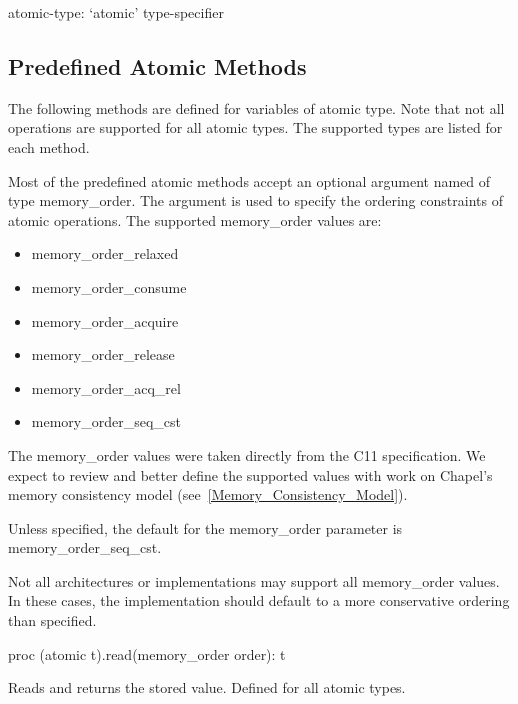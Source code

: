 \begin{syntax}
atomic-type:
  `atomic' type-specifier
\end{syntax}

\subsection{Predefined Atomic Methods}
\label{Functions_on_Atomic_Variables}

The following methods are defined for variables of atomic type. Note
that not all operations are supported for all atomic types. The
supported types are listed for each method.  

Most of the predefined atomic methods accept an optional argument
named  of type memory\_order. The  argument is
used to specify the ordering constraints of atomic operations. The
supported memory\_order values are:
\begin{itemize}
\item{memory\_order\_relaxed}
\item{memory\_order\_consume}
\item{memory\_order\_acquire}
\item{memory\_order\_release}
\item{memory\_order\_acq\_rel}
\item{memory\_order\_seq\_cst}
\end{itemize}

\begin{openissue}
  The memory\_order values were taken directly from the C11
  specification.  We expect to review and better define the supported
  values with work on Chapel's memory consistency model
  (see~\ref{Memory_Consistency_Model}).
\end{openissue}

Unless specified, the default for the memory\_order parameter is
memory\_order\_seq\_cst.

\begin{note}
Not all architectures or implementations may support all memory\_order
values.  In these cases, the implementation should default to a more
conservative ordering than specified.
\end{note}

\begin{protohead}
proc (atomic t).read(memory_order order): t
\end{protohead}
\begin{protobody}
Reads and returns the stored value. Defined for all atomic types.  
\end{protobody}

